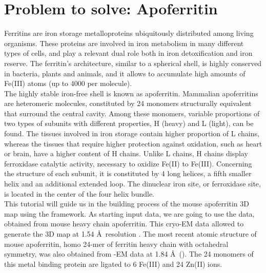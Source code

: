 
\section{Problem to solve: Apoferritin}

Ferritins are iron storage metalloproteins ubiquitously distributed among living organisms. These proteins are involved in iron metabolism in many different types of cells, and play a relevant dual role both in iron detoxification and iron reserve. The ferritin's architecture, similar to a spherical shell, is highly conserved in bacteria, plants and animals, and it allows to accumulate high amounts of Fe(III) atoms (up to 4000 per molecule). \\

The highly stable iron-free shell is known as apoferritin. Mammalian apoferritins are heteromeric molecules, constituted by 24 monomers structurally equivalent that surround the central cavity. Among these monomers, variable proportions of two types of subunits with different properties, H (heavy) and L (light), can be found. The tissues involved in iron storage contain higher proportion of L chains, whereas the tissues that require higher protection against oxidation, such as heart or brain, have a higher content of H chains. Unlike L chains, H chains display ferroxidase catalytic activity, necessary to oxidize Fe(II) to Fe(III). Concerning the structure of each subunit, it is constituted by 4 long helices, a fifth smaller helix and an additional extended loop. The dinuclear iron site, or ferroxidase site, is located in the center of the four helix bundle.\\

This tutorial will guide us in the building process of the mouse apoferritin 3D map using the \scipion framework. As starting input data, we are going to use the  data, obtained from mouse heavy chain apoferritin. This cryo-EM data allowed to generate the 3D map  at 1.54 \AA\ resolution \citep{hamaguchi2019}. The most recent atomic structure of mouse apoferritin, homo 24-mer of ferritin heavy chain with octahedral symmetry, was also obtained from \cryo-EM data at 1.84 \AA\ (). The 24 monomers of this metal binding protein are ligated to 6 Fe(III) and 24 Zn(II) ions.






